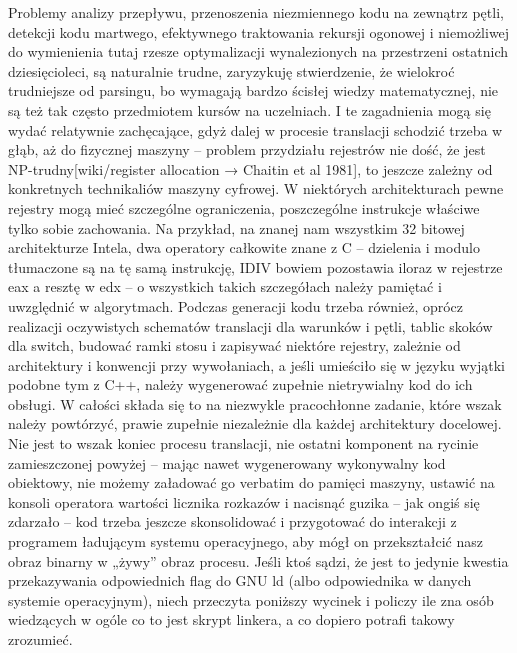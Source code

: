 Problemy analizy przepływu, przenoszenia niezmiennego kodu na zewnątrz pętli, detekcji kodu martwego, efektywnego traktowania rekursji ogonowej i niemożliwej do wymienienia tutaj rzesze optymalizacji wynalezionych na przestrzeni ostatnich dziesięcioleci, są naturalnie trudne, zaryzykuję stwierdzenie, że wielokroć trudniejsze od parsingu, bo wymagają bardzo ścisłej wiedzy matematycznej, nie są też tak często przedmiotem kursów na uczelniach. I te zagadnienia mogą się wydać relatywnie zachęcające, gdyż dalej w procesie translacji schodzić trzeba w głąb, aż do fizycznej maszyny – problem przydziału rejestrów nie dość, że jest NP-trudny[wiki/register allocation → Chaitin et al 1981], to jeszcze zależny od konkretnych technikaliów maszyny cyfrowej. W niektórych architekturach pewne rejestry mogą mieć szczególne ograniczenia, poszczególne instrukcje właściwe tylko sobie zachowania. Na przykład, na znanej nam wszystkim 32 bitowej architekturze Intela, dwa operatory całkowite znane z C – dzielenia i modulo tłumaczone są na tę samą instrukcję, IDIV bowiem pozostawia iloraz w rejestrze eax a resztę w edx – o wszystkich takich szczegółach należy pamiętać i uwzględnić w algorytmach. Podczas generacji kodu trzeba również, oprócz realizacji oczywistych schematów translacji dla warunków i pętli, tablic skoków dla switch, budować ramki stosu i zapisywać niektóre rejestry, zależnie od architektury i konwencji przy wywołaniach, a jeśli umieściło się w języku wyjątki podobne tym z C++, należy wygenerować zupełnie nietrywialny kod do ich obsługi. W całości składa się to na niezwykle pracochłonne zadanie, które wszak należy powtórzyć, prawie zupełnie niezależnie dla każdej architektury docelowej.
Nie jest to wszak koniec procesu translacji, nie ostatni komponent na rycinie zamieszczonej powyżej – mając nawet wygenerowany wykonywalny kod obiektowy, nie możemy załadować go verbatim do pamięci maszyny, ustawić na konsoli operatora wartości licznika rozkazów i nacisnąć guzika – jak ongiś się zdarzało – kod trzeba jeszcze skonsolidować i przygotować do interakcji z programem ładującym systemu operacyjnego, aby mógł on przekształcić nasz obraz binarny w „żywy” obraz procesu. Jeśli ktoś sądzi, że jest to jedynie kwestia przekazywania odpowiednich flag do GNU ld (albo odpowiednika w danych systemie operacyjnym), niech przeczyta poniższy wycinek i policzy ile zna osób wiedzących w ogóle co to jest skrypt linkera, a co dopiero potrafi takowy zrozumieć.

